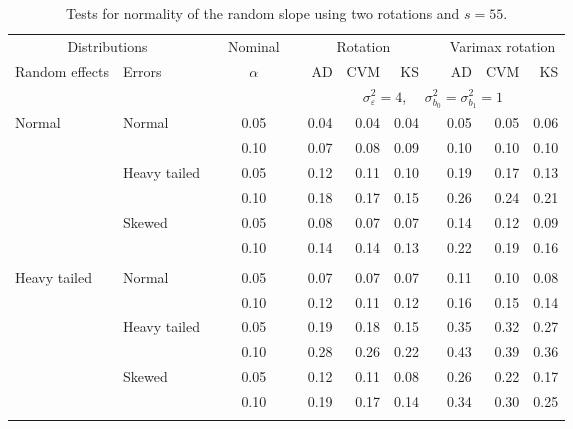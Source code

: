 \begin{table}[ht]
\caption{\label{tab:simb155}Tests for normality of the random slope using two rotations and $s = 55$.}
\begin{scriptsize}
\begin{center}
\begin{tabular}{ll p{.1cm} c p{.1cm} rrr p{.1cm} rrr}
  \hline
  \multicolumn{2}{c}{Distributions}& & Nominal & &  \multicolumn{3}{c}{Rotation} & & \multicolumn{3}{c}{Varimax rotation} \\ \cline{1-2} \cline{6-8} \cline{10-12}   
  Random effects & Errors & & $\alpha$ & & AD & CVM & KS & & AD & CVM & KS \\ 
   \hline
& && && \multicolumn{7}{c}{$\sigma_{\varepsilon}^2 = 4$, \ \ $\sigma_{b_0}^2 = \sigma_{b_1}^2 = 1$} \\ \cline{6-12}
\rowcolor{gray!20}Normal       & Normal       && 0.05 &&  0.04 & 0.04 & 0.04 && 0.05 & 0.05 & 0.06 \\ 
\rowcolor{gray!20}             &              && 0.10 &&  0.07 & 0.08 & 0.09 && 0.10 & 0.10 & 0.10 \\ 
\rowcolor{gray!20}             & Heavy tailed && 0.05 &&  0.12 & 0.11 & 0.10 && 0.19 & 0.17 & 0.13 \\ 
\rowcolor{gray!20}             &              && 0.10 &&  0.18 & 0.17 & 0.15 && 0.26 & 0.24 & 0.21 \\ 
\rowcolor{gray!20}             & Skewed       && 0.05 &&  0.08 & 0.07 & 0.07 && 0.14 & 0.12 & 0.09 \\ 
\rowcolor{gray!20}             &              && 0.10 &&  0.14 & 0.14 & 0.13 && 0.22 & 0.19 & 0.16 \\ 
             &&&&&&&&&&&\\
Heavy tailed & Normal       && 0.05 &&  0.07 & 0.07 & 0.07 && 0.11 & 0.10 & 0.08 \\ 
             &              && 0.10 &&  0.12 & 0.11 & 0.12 && 0.16 & 0.15 & 0.14 \\ 
             & Heavy tailed && 0.05 &&  0.19 & 0.18 & 0.15 && 0.35 & 0.32 & 0.27 \\ 
             &              && 0.10 &&  0.28 & 0.26 & 0.22 && 0.43 & 0.39 & 0.36 \\ 
             & Skewed       && 0.05 &&  0.12 & 0.11 & 0.08 && 0.26 & 0.22 & 0.17 \\ 
             &              && 0.10 &&  0.19 & 0.17 & 0.14 && 0.34 & 0.30 & 0.25 \\ 
             &&&&&&&&&&&\\

\end{tabular}
\end{center}
\end{scriptsize}
\end{table}
